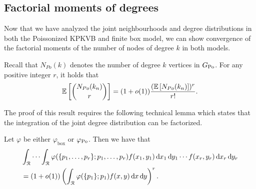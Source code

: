 \subsection{Factorial moments of degrees}\label{ssec:factorial_moments_GPo}

Now that we have analyzed the joint neighbourhoods and degree distributions in both the Poissonized KPKVB and finite box model, we can show convergence of the factorial moments of the number of nodes of degree $k$ in both models.

\begin{lemma}\label{lem:factmoment}
Recall that $N_{Po}(k)$ denotes the number of degree $k$ vertices in $G_{{\mathrm{Po}}}$. %
For any positive integer $r$, it holds that
\[
	\mathbb{E}\left[{N_{Po}(k_n) \choose r}\right] =(1+o(1)) \frac{(\mathbb{E}\left[ N_{Po}(k_n)\right])^r}{r!}.
\]
\end{lemma}

The proof of this result requires the following technical lemma which states that the integration of the joint degree distribution can be factorized.

\begin{lemma}
	\label{lem:asympind}
	Let $\varphi$ be either $\varphi_{\mathrm{box}}$ or $\varphi_{{\mathrm{Po}}}$. Then we have that
	\begin{align*}
	&\int_{{\mathcal R}} \cdots \int_{{\mathcal R}} \varphi(\{p_1,\dots,p_r \};p_1,\dots,p_r) 
		f(x_1,y_1) \operatorname{\mathrm{d}\hspace{-2pt}} x_1 \operatorname{\mathrm{d}\hspace{-2pt}} y_1 \cdots f(x_r,y_r)\operatorname{\mathrm{d}\hspace{-2pt}} x_r \operatorname{\mathrm{d}\hspace{-2pt}} y_r \\
	&= (1+o(1))\left(\int_{{\mathcal R}}  \varphi(\{p_1\};p_1) f(x,y) \operatorname{\mathrm{d}\hspace{-2pt}} x \operatorname{\mathrm{d}\hspace{-2pt}} y\right)^r .
	\end{align*}
\end{lemma}

